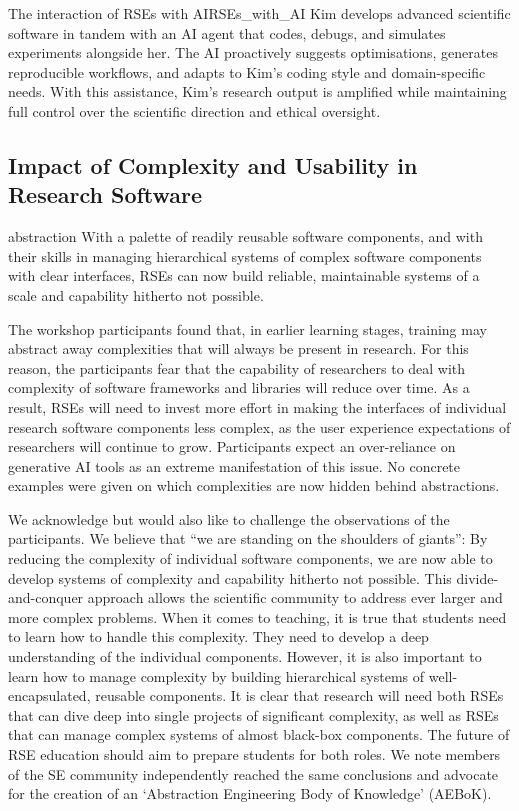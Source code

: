 \documentclass{eceasst}
\begin{document}
\begin{story}{The interaction of RSEs with AI}{RSEs_with_AI}
Kim develops advanced scientific software in tandem with an AI agent that codes,
debugs, and simulates experiments alongside her. The AI proactively suggests optimisations,
generates reproducible workflows, and adapts to Kim’s coding style and domain-specific needs.
With this assistance, Kim's research output is amplified while maintaining full control over the scientific direction and ethical oversight.
\end{story}

\subsection{Impact of Complexity and Usability in Research Software}
\label{sec:complexity}
\begin{whatis}{}{abstraction}
With a palette of readily reusable software components,
and with their skills in managing hierarchical systems of complex software components with clear interfaces,
RSEs can now build reliable, maintainable systems of a scale and capability hitherto not possible.
\end{whatis}

The workshop participants found that, in earlier learning stages,
training may abstract away complexities that will always be present in research.
For this reason, the participants fear that the capability of researchers to deal with complexity
of software frameworks and libraries will reduce over time.
As a result, RSEs will need to invest more effort in making the interfaces of individual research software components
less complex, as the user experience expectations of researchers will continue to grow.
Participants expect an over-reliance on generative AI tools as an extreme manifestation of this issue.
No concrete examples were given on which complexities are now hidden behind abstractions.

We acknowledge but would also like to challenge the observations of the participants.
We believe that ``we are standing on the shoulders of giants'':
By reducing the complexity of individual software components,
we are now able to develop systems of complexity and capability hitherto not possible.
This divide-and-conquer approach allows the scientific community to address ever larger and more complex problems.
When it comes to teaching, it is true that students need to learn how to handle this complexity.
They need to develop a deep understanding of the individual components.
However, it is also important to learn how to manage complexity
by building hierarchical systems of well-encapsulated, reusable components.
It is clear that research will need both RSEs that can dive deep into single projects of significant complexity,
as well as RSEs that can manage complex systems of almost black-box components.
The future of RSE education should aim to prepare students for both roles.
We note members of the SE community independently reached the same conclusions
and advocate for the creation of an `Abstraction Engineering Body of Knowledge'
(AEBoK)\cite{Bencomo2024AEBoK}.
\end{document}
